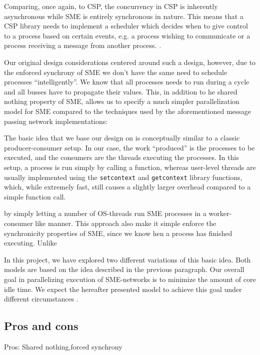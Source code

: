 Comparing, once again, to CSP, the concurrency in CSP is inherently
asynchronous while SME is entirely synchronous in nature. This means
that a CSP library needs to implement a scheduler which decides when
to give control to a process based on certain events, e.g. a process
wishing to communicate or a process receiving a message from another
process. .

Our original design considerations centered around such a design,
however, due to the enforced synchrony of SME we don't have the same
need to schedule processes ``intelligently''. We know that all
processes needs to run during a cycle and all busses have to propagate
their values. This, in addition to he shared nothing property of SME,
allows us to specify a much simpler parallelization model for SME
compared to the techniques used by the aforementioned message passing
network implementations:

The basic idea that we base our design on is conceptually similar to a
classic producer-consumer setup. In our case, the work ``produced'' is
the processes to be executed, and the consumers are the threads
executing the processes. In this setup, a process is run simply by
calling a function, whereas user-level threads are usually implemented
using the \texttt{setcontext} and \texttt{getcontext} library
functions, which, while extremely fast, still causes a slightly larger
overhead compared to a simple function call. 

by simply letting a number of OS-threads run SME processes in a
worker-consumer like manner. This approach also make it simple enforce
the synchronicity properties of SME, since we know hen a process has
finished executing. Unlike

In this project, we have explored two different variations of this
basic idea. Both models are based on the idea described in the
previous paragraph. Our overall goal in parallelizing execution of
SME-networks is to minimize the amount of core idle time. We expect
the hereafter presented model to achieve this goal under different
circumstances .



\subsection{Pros and cons}
Pros: Shared nothing,forced synchrony 

